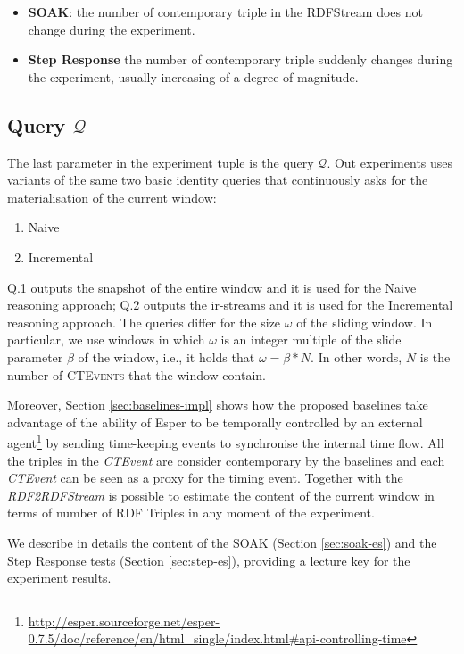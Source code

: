 \begin{itemize}
\item \textbf{SOAK}: the number of contemporary triple in the RDFStream does not change during the experiment.
\item \textbf{Step Response} the number of contemporary triple suddenly changes during the experiment, usually increasing of a degree of magnitude.
\end{itemize}

\subsection{Query $\mathcal{Q}$}\label{sec:query}
 
The last parameter in the experiment tuple is the query $\mathcal{Q}$. Out  experiments uses variants of the same two basic identity queries that continuously asks for the materialisation of the current window:
\begin{enumerate}
\item[Q.1] Naive
\item[Q.2] Incremental
\end{enumerate}
 		 
Q.1 outputs the snapshot of the entire window and it is used for the Naive reasoning approach; Q.2 outputs the ir-streams and it is used for the Incremental reasoning approach. The queries differ for the size $\omega$ of the sliding window. In particular, we use windows in which $\omega$ is an integer multiple of the slide parameter $\beta$ of the window, i.e., it holds that $\omega = \beta * N$. In other words, $N$ is the number of \textsc{CTEvents} that the window contain. 

Moreover, Section \ref{sec:baselines-impl} shows how the proposed baselines take advantage of the ability of Esper to be temporally controlled by an external agent\footnote{\url{http://esper.sourceforge.net/esper-0.7.5/doc/reference/en/html_single/index.html#api-controlling-time}} by sending time-keeping events to synchronise the internal time flow. All the triples in the \textit{CTEvent} are consider contemporary by the baselines and each \textit{CTEvent} can be seen as a proxy for the timing event. Together with the \textit{RDF2RDFStream} is possible to estimate the content of the current window in terms of number of RDF Triples in any moment of the experiment.

We describe in details the content of the SOAK (Section \ref{sec:soak-es}) and the Step Response tests (Section \ref{sec:step-es}), providing a lecture key for the experiment results.

